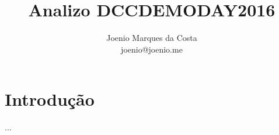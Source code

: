 \documentclass{article}
\title{
  Analizo DCCDEMODAY2016
}
\author{Joenio Marques da Costa\\
  {\small joenio@joenio.me}
}
\begin{document}
\maketitle

\section{Introdução}

...


\appendix
\end{document}
